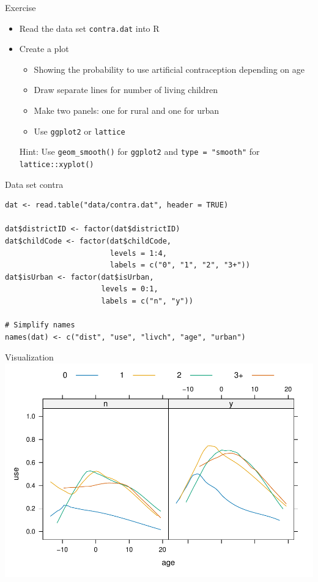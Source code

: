 \documentclass[aspectratio=169]{beamer}
\begin{document}
\begin{frame}{}
  \begin{block}{Exercise}
    \begin{itemize}
      \item Read the data set \texttt{contra.dat} into R
      \item Create a plot
        \begin{itemize}
          \item Showing the probability to use artificial
        contraception depending on age
          \item Draw separate lines for number of living children
          \item Make two panels: one for rural and one for urban
          \item Use \texttt{ggplot2} or \texttt{lattice}\\[1.8ex]
        \end{itemize}
            Hint: Use \texttt{geom\_smooth()} for \texttt{ggplot2} and
            \texttt{type = "smooth"} for \texttt{lattice::xyplot()}
    \end{itemize}
  \end{block}
\end{frame}

\begin{frame}[fragile]{Data set contra}
\begin{lstlisting}
dat <- read.table("data/contra.dat", header = TRUE)

dat$districtID <- factor(dat$districtID)
dat$childCode <- factor(dat$childCode,
                        levels = 1:4,
                        labels = c("0", "1", "2", "3+"))
dat$isUrban <- factor(dat$isUrban,
                      levels = 0:1,
                      labels = c("n", "y"))

# Simplify names
names(dat) <- c("dist", "use", "livch", "age", "urban")
\end{lstlisting}
\end{frame}

\begin{frame}{Visualization}
  \centering
  \includegraphics[scale = .7]{../figures/contra_data}
\end{frame}
\end{document}
